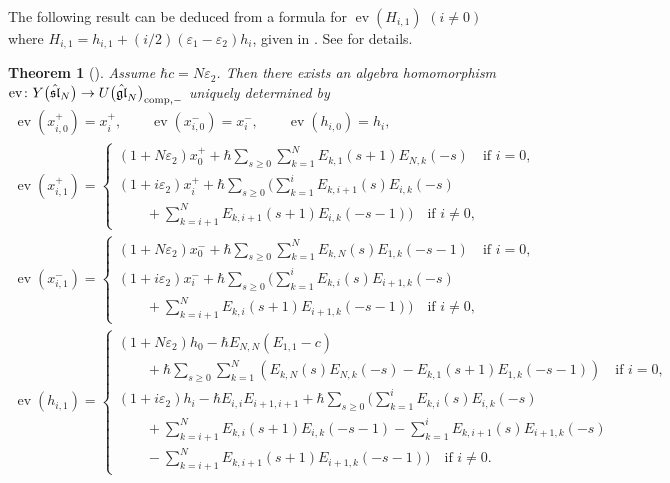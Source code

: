 \documentclass[pdftex]{sigma}
\newtheorem{thm}{Theorem}[section]
\theoremstyle{definition}
\numberwithin{equation}{section}
\DeclareMathOperator{\ev}{ev}
\newcommand{\ve}{\varepsilon}
\newcommand{\affY}{Y\big(\affsl\big)}
\newcommand{\gl}{\mathfrak{gl}}
\newcommand{\affsl}{\hat{\mathfrak{sl}}_N}
\begin{document}
The following result can be deduced from a formula for $\ev(H_{i,1})$ $(i \neq 0)$ where $H_{i,1}=h_{i,1} + (i/2)(\ve_1-\ve_2)h_i$, given in \cite[Section~6, pp.~462--463]{MR2323534}. See \cite{kodera_evaluation} for details.
\begin{thm}[\cite{MR2323534, kodera_evaluation}]Assume $\hbar c = N \ve_2$. Then there exists an algebra homomorphism $\ev \colon \affY \to U\big(\hat{\gl}_N\big)_{{\rm comp},-}$ uniquely determined by
\begin{gather*}
\ev(x_{i,0}^{+}) = x_{i}^{+}, \qquad \ev(x_{i,0}^{-}) = x_{i}^{-},\qquad \ev(h_{i,0}) = h_{i},\\
\ev(x_{i,1}^{+}) = \begin{cases}
(1+ N \varepsilon_2) x_{0}^{+} + \hbar \displaystyle\sum_{s \geq 0} \sum_{k=1}^N E_{k,1}(s+1) E_{N,k}(-s) \quad \text{if $i = 0$},\\
(1+ i \varepsilon_2) x_{i}^{+} + \hbar \displaystyle\sum_{s \geq 0} \bigg( \sum_{k=1}^i E_{k,i+1}(s) E_{i,k}(-s)\\
\qquad{} + \displaystyle \sum_{k=i+1}^N E_{k,i+1}(s+1) E_{i,k}(-s-1) \bigg) \quad \text{if $i \neq 0$},
\end{cases}\\
\ev(x_{i,1}^-) = \begin{cases}
(1+ N \varepsilon_2) x_{0}^{-} + \hbar \displaystyle\sum_{s \geq 0} \sum_{k=1}^N E_{k,N}(s) E_{1,k}(-s-1)\quad \text{if $i = 0$},\\
(1+ i \varepsilon_2) x_{i}^{-} + \hbar \displaystyle\sum_{s \geq 0} \bigg( \sum_{k=1}^i E_{k,i}(s) E_{i+1,k}(-s) \\
\qquad {} + \displaystyle\sum_{k=i+1}^N E_{k,i}(s+1) E_{i+1,k}(-s-1) \bigg) \quad \text{if $i \neq 0$},
\end{cases}\\
\ev(h_{i,1}) = \begin{cases}
(1+ N \varepsilon_2) h_{0} - \hbar E_{N,N} (E_{1,1}-c) \\
\qquad {}+ \hbar \displaystyle\sum_{s \geq 0} \sum_{k=1}^{N} ( E_{k,N}(s) E_{N,k}(-s) - E_{k,1}(s+1) E_{1,k}(-s-1) ) \quad \text{if $i = 0$},\\
(1+ i \varepsilon_2) h_{i} - \hbar E_{i,i}E_{i+1,i+1}+ \hbar \displaystyle\sum_{s \geq 0} \bigg( \sum_{k=1}^{i} E_{k,i}(s) E_{i,k}(-s) \\
\qquad{}+ \displaystyle\sum_{k=i+1}^{N} E_{k,i}(s+1) E_{i,k}(-s-1) - \displaystyle\sum_{k=1}^{i}E_{k,i+1}(s) E_{i+1,k}(-s) \\
\qquad {} - \displaystyle\sum_{k=i+1}^{N} E_{k,i+1}(s+1) E_{i+1,k}(-s-1) \bigg)\quad \text{if $i \neq 0$}.
\end{cases}
\end{gather*}
\end{thm}
\end{document}
